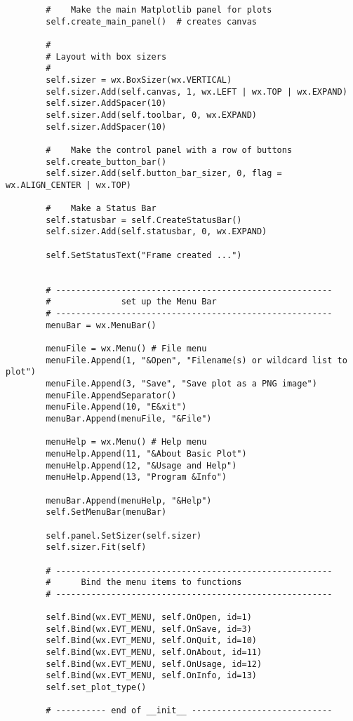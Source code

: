 \documentclass[12pt]{article}
\begin{document}
\begin{verbatim}
        #    Make the main Matplotlib panel for plots
        self.create_main_panel()  # creates canvas

        #
        # Layout with box sizers
        #
        self.sizer = wx.BoxSizer(wx.VERTICAL)
        self.sizer.Add(self.canvas, 1, wx.LEFT | wx.TOP | wx.EXPAND)
        self.sizer.AddSpacer(10)
        self.sizer.Add(self.toolbar, 0, wx.EXPAND)
        self.sizer.AddSpacer(10)

        #    Make the control panel with a row of buttons
        self.create_button_bar()
        self.sizer.Add(self.button_bar_sizer, 0, flag = wx.ALIGN_CENTER | wx.TOP)

        #    Make a Status Bar
        self.statusbar = self.CreateStatusBar()
        self.sizer.Add(self.statusbar, 0, wx.EXPAND)

        self.SetStatusText("Frame created ...")


        # -------------------------------------------------------
        #              set up the Menu Bar
        # -------------------------------------------------------
        menuBar = wx.MenuBar()

        menuFile = wx.Menu() # File menu
        menuFile.Append(1, "&Open", "Filename(s) or wildcard list to plot")
        menuFile.Append(3, "Save", "Save plot as a PNG image")
        menuFile.AppendSeparator()
        menuFile.Append(10, "E&xit")
        menuBar.Append(menuFile, "&File")

        menuHelp = wx.Menu() # Help menu
        menuHelp.Append(11, "&About Basic Plot")
        menuHelp.Append(12, "&Usage and Help")
        menuHelp.Append(13, "Program &Info")

        menuBar.Append(menuHelp, "&Help")
        self.SetMenuBar(menuBar)

        self.panel.SetSizer(self.sizer)
        self.sizer.Fit(self)

        # -------------------------------------------------------
        #      Bind the menu items to functions
        # -------------------------------------------------------

        self.Bind(wx.EVT_MENU, self.OnOpen, id=1)
        self.Bind(wx.EVT_MENU, self.OnSave, id=3)
        self.Bind(wx.EVT_MENU, self.OnQuit, id=10)
        self.Bind(wx.EVT_MENU, self.OnAbout, id=11)
        self.Bind(wx.EVT_MENU, self.OnUsage, id=12)
        self.Bind(wx.EVT_MENU, self.OnInfo, id=13)
        self.set_plot_type()

        # ---------- end of __init__ ----------------------------


\end{verbatim}
\end{document}
